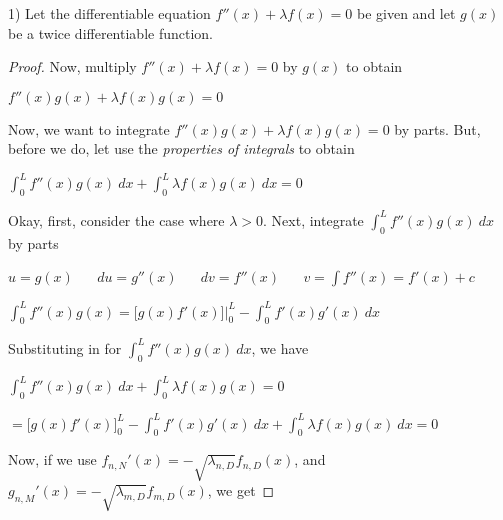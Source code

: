 \documentclass[executivepaper]{article}
\begin{document}
\begin{flushleft}

1) Let the differentiable equation $f''(x)+\lambda f(x)=0$ be given and let $g(x)$ be a twice differentiable function. \\ 

\begin{proof}

Now, multiply $f''(x)+\lambda f(x)=0$ by $g(x)$ to obtain

\begin{center}

$f''(x)g(x)+\lambda f(x)g(x)=0$

\end{center}

Now, we want to integrate $f''(x)g(x)+\lambda f(x)g(x)=0$ by parts. But, before we do, let use the \textit{properties of integrals} to obtain

\begin{center}

$\int_{0}^{L} f''(x)g(x) \ dx + \int_{0}^{L} \lambda f(x)g(x) \ dx=0$

\end{center}

Okay, first, consider the case where $\lambda > 0$. Next, integrate $\int_{0}^{L} f''(x)g(x) \ dx$ by parts

\begin{center}

$u=g(x)$ $\quad$ $du=g''(x)$ $\quad$ $dv=f''(x)$ $\quad$ $v=\int f''(x)=f'(x)+c$

\vspace{2mm}

$\int_{0}^{L} f''(x)g(x)= \bigg[g(x)f'(x)\bigg] \bigg|_{0}^{L} - \int_{0}^{L} f'(x)g'(x) \ dx$

\end{center}

Substituting in for $\int_{0}^{L} f''(x)g(x) \ dx$, we have

\begin{center}

$\int_{0}^{L} f''(x)g(x) \ dx + \int_{0}^{L} \lambda f(x)g(x)=0$

\vspace{2mm}

$=\bigg[g(x)f'(x)\bigg]_{0}^{L} - \int_{0}^{L} f'(x)g'(x) \ dx + \int_{0}^{L} \lambda f(x)g(x) \ dx=0$

\end{center}

Now, if we use $f_{n,N}'(x)=-\sqrt{\lambda_{n,D}} f_{n,D}(x)$, and $g_{n,M}'(x)=-\sqrt{\lambda_{m,D}} f_{m,D}(x)$, we get


\end{proof}
\end{flushleft}
\end{document}
